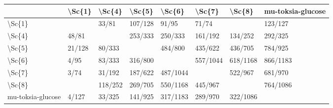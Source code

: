\begin{tabular}{llllllll}
\toprule
{} &  \textbackslash Sc\{1\} &   \textbackslash Sc\{4\} &   \textbackslash Sc\{5\} &    \textbackslash Sc\{6\} &    \textbackslash Sc\{7\} &    \textbackslash Sc\{8\} & mu-toksia-glucose \\
\midrule
\textbackslash Sc\{1\}            &         &    33/81 &  107/128 &     91/95 &     71/74 &           &           123/127 \\
\textbackslash Sc\{4\}            &   48/81 &          &  253/333 &   250/333 &   161/192 &   134/252 &           292/325 \\
\textbackslash Sc\{5\}            &  21/128 &   80/333 &          &   484/800 &   435/622 &   436/705 &           784/925 \\
\textbackslash Sc\{6\}            &    4/95 &   83/333 &  316/800 &           &  557/1044 &  618/1168 &          866/1183 \\
\textbackslash Sc\{7\}            &    3/74 &   31/192 &  187/622 &  487/1044 &           &   522/967 &           681/970 \\
\textbackslash Sc\{8\}            &         &  118/252 &  269/705 &  550/1168 &   445/967 &           &          764/1086 \\
mu-toksia-glucose &   4/127 &   33/325 &  141/925 &  317/1183 &   289/970 &  322/1086 &                   \\
\bottomrule
\end{tabular}
